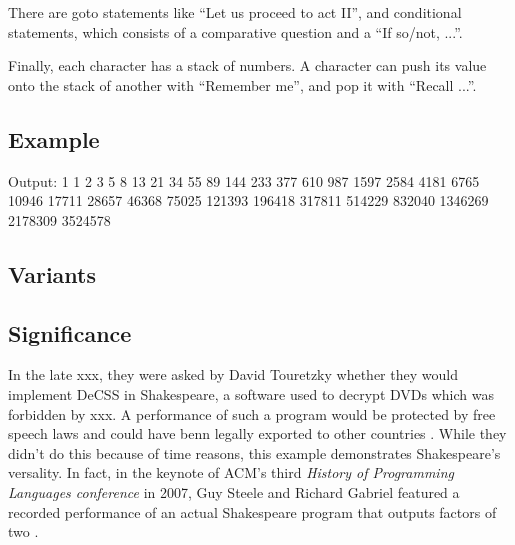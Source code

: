 There are goto statements like “Let us proceed to act II”, and conditional statements, which consists of a comparative question and a “If so/not, ...”.

Finally, each character has a stack of numbers. A character can push its value onto the stack of another with “Remember me”, and pop it with “Recall ...”.

\subsection{Example}


\begin{io}
Output:
1 1 2 3 5 8 13 21 34 55 89 144 233 377 610 987 1597 2584
4181 6765 10946 17711 28657 46368 75025 121393 196418
317811 514229 832040 1346269 2178309 3524578
\end{io}

\subsection{Variants}

\blindtext[3]

\subsection{Significance}



In the late xxx, they were asked by David Touretzky whether they would implement DeCSS in Shakespeare, a software used to decrypt DVDs which was forbidden by xxx. A performance of such a program would be protected by free speech laws and could have benn legally exported to other countries \cite{herrick2011az}. While they didn't do this because of time reasons, this example demonstrates Shakespeare's versality. In fact, in the keynote of ACM's third \emph{History of Programming Languages conference} in 2007, Guy Steele and Richard Gabriel featured a recorded performance of an actual Shakespeare program that outputs factors of two \cite{chapiewski2007computational}.
